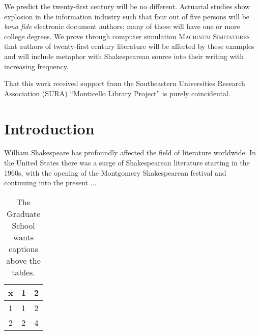 \documentclass[12pt,dvips]{report}
\begin{document}
We predict the twenty-first century will be no different.  Actuarial
studies show explosion in the information industry such that four out
of five persons will be \textit{bona fide} electronic document
authors; many of those will have one or more college degrees.  We
prove through computer simulation \textsc{Machinum Simitatores} that
authors of twenty-first century literature will be affected by these
examples and will include metaphor with Shakespearean source into
their writing with increasing frequency.

\vfill


That this work received support from the Southeastern Universities
Research Association (SURA) ``Monticello Library Project'' is purely
coincidental.

\pagebreak


\tableofcontents
\pagebreak

\listoffigures
\pagebreak

\listoftables
\pagebreak

\pagestyle{myheadings}

\chapter{Introduction}

William Shakespeare has profoundly affected the field of literature
worldwide.  In the United States there was a surge of Shakespearean
literature starting in the 1960s, with the opening of the Montgomery
Shakespearean festival and continuing into the present ...

%
%

%

 \begin{table}
 \caption{The Graduate School wants captions above the tables.}
\begin{center}
 \begin{tabular}{ccc}
 x & 1 & 2 \\ \hline
 1 & 1 & 2 \\
 2 & 2 & 4 \\ \hline
 \end{tabular}
\end{center}
 \end{table}
\end{document}
